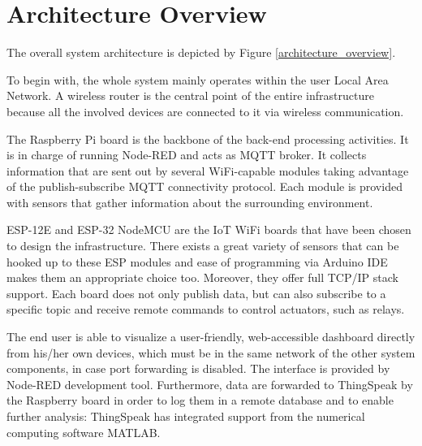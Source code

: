 \section{Architecture Overview}
The overall system architecture is depicted by Figure \ref{architecture_overview}.

To begin with, the whole system mainly operates within the user Local Area Network. A wireless router is the central point of the entire infrastructure because all the involved devices are connected to it via wireless communication.

The Raspberry Pi board is the backbone of the back-end processing activities. It is in charge of running Node-RED and acts as MQTT broker. It collects information that are sent out by several WiFi-capable modules taking advantage of the publish-subscribe MQTT connectivity protocol. Each module is provided with sensors that gather information about the surrounding environment.

ESP-12E and ESP-32 NodeMCU are the IoT WiFi boards that have been chosen to design the infrastructure. There exists a great variety of sensors that can be hooked up to these ESP modules and ease of programming via Arduino IDE makes them an appropriate choice too. Moreover, they offer full TCP/IP stack support.
Each board does not only publish data, but can also subscribe to a specific topic and receive remote commands to control actuators, such as relays.

The end user is able to visualize a user-friendly, web-accessible dashboard directly from his/her own devices, which must be in the same network of the other system components, in case port forwarding is disabled. The interface is provided by Node-RED development tool.
Furthermore, data are forwarded to ThingSpeak by the Raspberry board in order to log them in a remote database and to enable further analysis: ThingSpeak has integrated support from the numerical computing software MATLAB.

